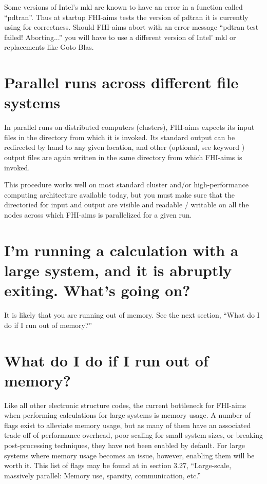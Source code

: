 Some versions of Intel's mkl are known to have an error in a function
called  ``pdtran''. Thus at startup FHI-aims tests the version of
pdtran it is currently using for correctness. Should FHI-aims abort
with an error message ``pdtran test failed! Aborting...'' you will
have to use a different version of Intel' mkl or replacements like
Goto Blas.

\section{Parallel runs across different file systems}

In parallel runs on distributed computers (clusters), FHI-aims expects
its input files in the directory from which it is invoked. Its
standard output can be redirected by hand to any given location, and
other (optional, see keyword ) output files are
again written in the same directory from which FHI-aims is invoked.

This procedure works well on most standard cluster and/or
high-performance computing architecture available today, but you must
make sure that the directoried for input and output are visible and
readable / writable on all the nodes across which FHI-aims is
parallelized for a given run.

\section{I'm running a calculation with a large system, and it is abruptly exiting.  What's going on?}

It is likely that you are running out of memory.  See the next section, ``What
do I do if I run out of memory?''

\section{What do I do if I run out of memory?}

Like all other electronic structure codes, the current bottleneck for
FHI-aims when performing calculations for large systems is memory usage.  
A number of flags exist to alleviate memory usage, but as many of them
have an associated trade-off of performance overhead, poor scaling for 
small system sizes, or breaking post-processing techniques, they have not 
been enabled by default.  For large systems where memory usage becomes
an issue, however, enabling them will be worth it.  This list of flags 
may be found at in section 3.27, ``Large-scale, massively parallel: 
Memory use, sparsity, communication, etc.''

